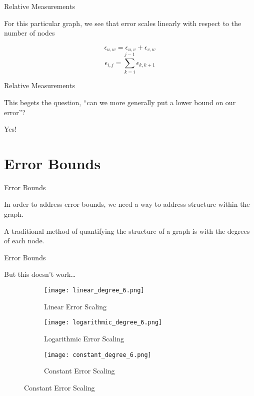 \documentclass{beamer}
\begin{document}
\begin{frame}{Relative Measurements}

\begin{center}
For this particular graph, we see that error scales linearly with respect to the
number of nodes
\begin{figure}
\end{figure}
\[ \epsilon_{u,w} = \epsilon_{u,v} + \epsilon_{v,w} \]
\[ \epsilon_{i,j} = \sum_{k = i}^{j-1} \epsilon_{k,k+1} \]
\end{center}
\end{frame}

\begin{frame}{Relative Measurements}

\begin{center}
This begets the question, ``can we more generally put a lower bound on our
error''?
\pause
\vspace{5mm}

Yes!
\end{center}
\end{frame}

\section{Error Bounds}
\begin{frame}{Error Bounds}
\begin{center}
In order to address error bounds, we need a way to address structure within the
graph.
\pause
\vspace{5mm}

A traditional method of quantifying the structure of a graph is with the degrees
of each node.
\end{center}
\end{frame}


\begin{frame}{Error Bounds}
\begin{center}
But this doesn't work\ldots
\begin{figure}
\begin{subfigure}[c]{0.3\textwidth}
\texttt{[image: linear\_degree\_6.png]}
\caption{Linear Error Scaling}
\end{subfigure}
\begin{subfigure}[c]{0.3\textwidth}
\texttt{[image: logarithmic\_degree\_6.png]}
\caption{Logarithmic Error Scaling}
\end{subfigure}
\begin{subfigure}[c]{0.3\textwidth}
\texttt{[image: constant\_degree\_6.png]}
\caption{Constant Error Scaling}
\end{subfigure}
\end{figure}
\end{center}
\end{frame}
\end{document}
